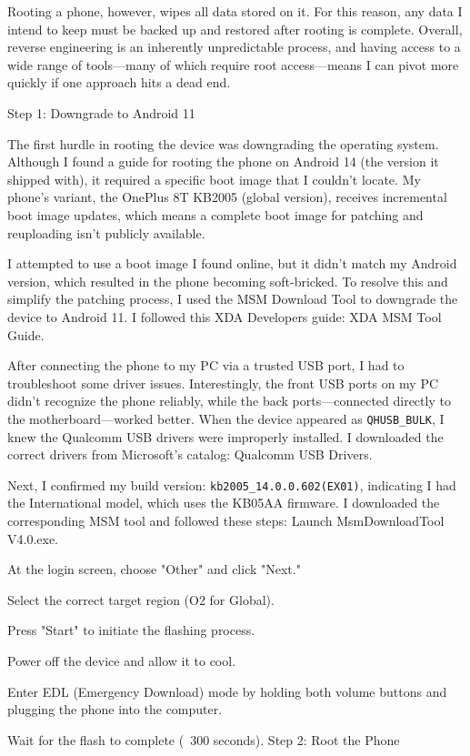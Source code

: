 Rooting a phone, however, wipes all data stored on it. For this reason, any data I intend to keep must be backed up and restored after rooting is complete. Overall, reverse engineering is an inherently unpredictable process, and having access to a wide range of tools—many of which require root access—means I can pivot more quickly if one approach hits a dead end.

Step 1: Downgrade to Android 11

The first hurdle in rooting the device was downgrading the operating system. Although I found a guide for rooting the phone on Android 14 (the version it shipped with), it required a specific boot image that I couldn’t locate. My phone’s variant, the OnePlus 8T KB2005 (global version), receives incremental boot image updates, which means a complete boot image for patching and reuploading isn't publicly available.

I attempted to use a boot image I found online, but it didn’t match my Android version, which resulted in the phone becoming soft-bricked. To resolve this and simplify the patching process, I used the MSM Download Tool to downgrade the device to Android 11. I followed this XDA Developers guide: XDA MSM Tool Guide.

After connecting the phone to my PC via a trusted USB port, I had to troubleshoot some driver issues. Interestingly, the front USB ports on my PC didn’t recognize the phone reliably, while the back ports—connected directly to the motherboard—worked better. When the device appeared as \texttt{QHUSB\_BULK}, I knew the Qualcomm USB drivers were improperly installed. I downloaded the correct drivers from Microsoft’s catalog: Qualcomm USB Drivers.

Next, I confirmed my build version: \texttt{kb2005\_14.0.0.602(EX01)}, indicating I 
had the International model, which uses the KB05AA firmware. I downloaded the corresponding MSM tool and followed these steps:
Launch MsmDownloadTool V4.0.exe.


At the login screen, choose "Other" and click "Next."


Select the correct target region (O2 for Global).


Press "Start" to initiate the flashing process.


Power off the device and allow it to cool.


Enter EDL (Emergency Download) mode by holding both volume buttons and plugging the phone into the computer.


Wait for the flash to complete (~300 seconds).
Step 2: Root the Phone

